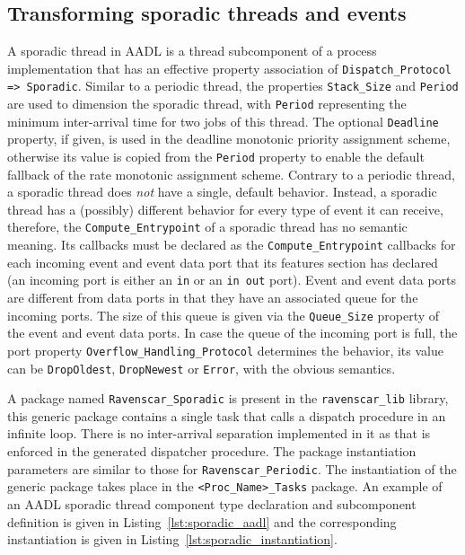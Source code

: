 \subsection{Transforming sporadic threads and events}
A sporadic thread in AADL is a thread subcomponent of a process
implementation that has an effective property association of
\texttt{Dispatch\_Protocol => Sporadic}. Similar to a periodic thread,
the properties \texttt{Stack\_Size} and \texttt{Period} are used to
dimension the sporadic thread, with \texttt{Period} representing the
minimum inter-arrival time for two jobs of this thread. The optional
\texttt{Deadline} property, if given, is used in the deadline
monotonic priority assignment scheme, otherwise its value is copied
from the \texttt{Period} property to enable the default fallback of
the rate monotonic assignment scheme. Contrary to a periodic thread, a
sporadic thread does \emph{not} have a single, default
behavior. Instead, a sporadic thread has a (possibly) different
behavior for every type of event it can receive, therefore, the
\texttt{Compute\_Entrypoint} of a sporadic thread has no semantic
meaning. Its callbacks must be declared as the
\texttt{Compute\_Entrypoint} callbacks for each incoming event and
event data port that its features section has declared (an incoming
port is either an \texttt{in} or an \texttt{in out} port). Event and
event data ports are different from data ports in that they have an
associated queue for the incoming ports. The size of this queue is
given via the \texttt{Queue\_Size} property of the event and event
data ports. In case the queue of the incoming port is full, the port
property \texttt{Overflow\_Handling\_Protocol} determines the
behavior, its value can be \texttt{DropOldest}, \texttt{DropNewest} or
\texttt{Error}, with the obvious semantics.

A package named \texttt{Ravenscar\_Sporadic} is present in the
\texttt{ravenscar\_lib} library, this generic package contains a
single task that calls a dispatch procedure in an infinite loop. There
is no inter-arrival separation implemented in it as that is enforced
in the generated dispatcher procedure. The package instantiation
parameters are similar to those for \texttt{Ravenscar\_Periodic}. The
instantiation of the generic package takes place in the
\texttt{<Proc\_Name>\_Tasks} package. An example of an AADL sporadic
thread component type declaration and subcomponent definition is given
in Listing~\ref{lst:sporadic_aadl} and the corresponding instantiation
is given in Listing~\ref{lst:sporadic_instantiation}.

